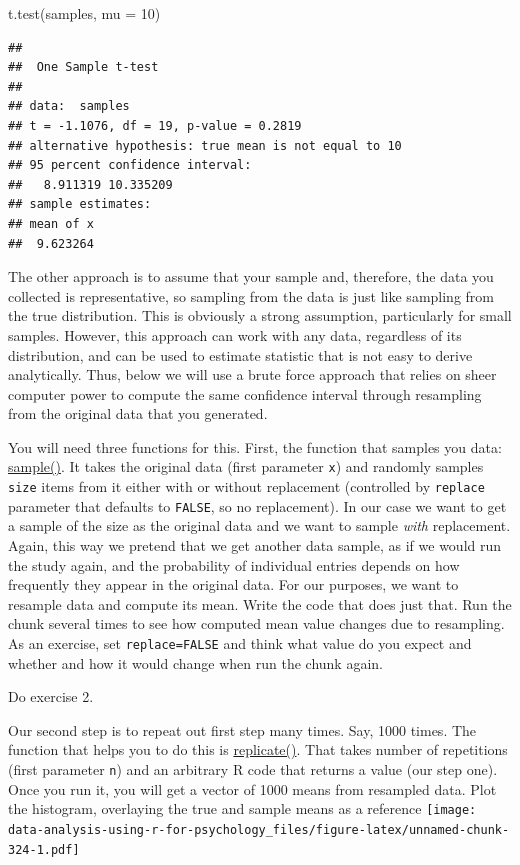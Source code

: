 \documentclass[
]{book}
\newenvironment{Shaded}{\begin{snugshade}}{\end{snugshade}}
\newcommand{\AttributeTok}[1]{\textcolor[rgb]{0.77,0.63,0.00}{#1}}
\newcommand{\DecValTok}[1]{\textcolor[rgb]{0.00,0.00,0.81}{#1}}
\newcommand{\FunctionTok}[1]{\textcolor[rgb]{0.00,0.00,0.00}{#1}}
\newcommand{\NormalTok}[1]{#1}
\begin{document}
\begin{Shaded}
\begin{Highlighting}[]
\FunctionTok{t.test}\NormalTok{(samples, }\AttributeTok{mu =} \DecValTok{10}\NormalTok{)}
\end{Highlighting}
\end{Shaded}

\begin{verbatim}
## 
##  One Sample t-test
## 
## data:  samples
## t = -1.1076, df = 19, p-value = 0.2819
## alternative hypothesis: true mean is not equal to 10
## 95 percent confidence interval:
##   8.911319 10.335209
## sample estimates:
## mean of x 
##  9.623264
\end{verbatim}

The other approach is to assume that your sample and, therefore, the data you collected is representative, so sampling from the data is just like sampling from the true distribution. This is obviously a strong assumption, particularly for small samples. However, this approach can work with any data, regardless of its distribution, and can be used to estimate statistic that is not easy to derive analytically. Thus, below we will use a brute force approach that relies on sheer computer power to compute the same confidence interval through resampling from the original data that you generated.

You will need three functions for this. First, the function that samples you data: \href{https://stat.ethz.ch/R-manual/R-devel/library/base/html/sample.html}{sample()}. It takes the original data (first parameter \texttt{x}) and randomly samples \texttt{size} items from it either with or without replacement (controlled by \texttt{replace} parameter that defaults to \texttt{FALSE}, so no replacement). In our case we want to get a sample of the size as the original data and we want to sample \emph{with} replacement. Again, this way we pretend that we get another data sample, as if we would run the study again, and the probability of individual entries depends on how frequently they appear in the original data. For our purposes, we want to resample data and compute its mean. Write the code that does just that. Run the chunk several times to see how computed mean value changes due to resampling. As an exercise, set \texttt{replace=FALSE} and think what value do you expect and whether and how it would change when run the chunk again.

Do exercise 2.

Our second step is to repeat out first step many times. Say, 1000 times. The function that helps you to do this is \href{https://stat.ethz.ch/R-manual/R-devel/library/base/html/lapply.html}{replicate()}. That takes number of repetitions (first parameter \texttt{n}) and an arbitrary R code that returns a value (our step one). Once you run it, you will get a vector of 1000 means from resampled data. Plot the histogram, overlaying the true and sample means as a reference
\texttt{[image: data-analysis-using-r-for-psychology\_files/figure-latex/unnamed-chunk-324-1.pdf]}
\end{document}
